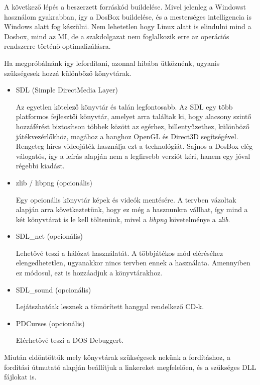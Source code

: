 A következő lépés a beszerzett forráskód buildelése. Mivel jelenleg a Windowst használom gyakrabban, így a DosBox buildelése, és a mesterséges intelligencia is Windows alatt fog készülni. Nem lehetetlen hogy Linux alatt is elindulni mind a Dosbox, mind az MI, de a szakdolgazat nem foglalkozik erre az operációs rendszerre történő optimalizálásra.

Ha megpróbálnánk így lefordítani, azonnal hibába ütköznénk, ugyanis szükségesek hozzá különböző könyvtárak.

\begin{itemize}

    \item SDL (Simple DirectMedia Layer)
    
    Az egyetlen kötelező könyvtár és talán legfontosabb. Az SDL egy több platformos fejlesztői könyvtár, amelyet arra találtak ki, hogy alacsony szintő hozzáférést biztosítson többek között az egérhez, billentyűzethez, különböző játékvezérlőkhöz, magához a hanghoz OpenGL és Direct3D segítségével. Rengeteg híres videojáték használja ezt a technológiát. Sajnos a DosBox elég válogatós, így a leírás alapján nem a legfirsebb verziót kéri, hanem egy jóval régebbi kiadást.
    \item zlib / libpng (opcionális)
    
    Egy opcionális könyvtár képek és videók mentésére. A tervben vázoltak alapján arra következtetünk, hogy ez még a hasznunkra vállhat, így mind a két könyvtárat is le kell töltenünk, mivel a \textit{libpng} követelménye a \textit{zlib}. 
    \item SDL\_net (opcionális)
    
    Lehetővé teszi a hálózat használatát. A többjátékos mód eléréséhez elengedhetetlen, ugyanakkor nincs tervben ennek a használata. Amennyiben ez módosul, ezt is hozzáadjuk a könyvtárakhoz.
    \item SDL\_sound (opcionális)
    
    Lejátszhatóak lesznek a tömörített hanggal rendelkező CD-k.
    \item PDCurses (opcionális)
    
    Elérhetővé teszi a DOS Debuggert.

\end{itemize}

Miután eldöntöttük mely könyvtárak szükségesek nekünk a fordításhoz, a fordítási útmutató alapján beállítjuk a linkereket megfelelően, és a szükséges DLL fájlokat is. 

